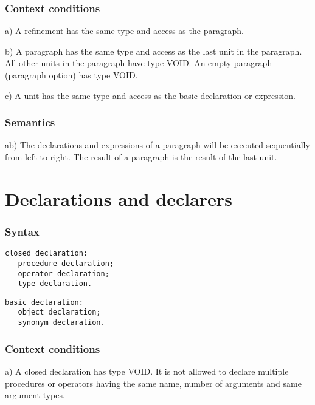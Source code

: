 \documentclass [a4paper,12pt,fleqn]{article}
\begin{document}
\subsubsection*{Context conditions}
\begin{list}{-}{}
\item[a)]
A refinement has the same type and access as the paragraph.
\item[b)]
A paragraph has the same type and access as the last unit in the
paragraph. All other units in the paragraph have type VOID.
An empty paragraph (paragraph option) has type VOID.
\item[c)]
A unit has the same type and access as the basic declaration or expression.
\end{list}
\subsubsection*{Semantics}
\begin{list}{-}{}
\item[ab)]
The declarations and expressions of a paragraph will be executed
sequentially from left to right. The result of a paragraph is
the result of the last unit.
\end{list}
\section {Declarations and declarers}
\subsubsection*{Syntax}
\begin{letterlist}
\item
\begin{verbatim}
closed declaration:
   procedure declaration;
   operator declaration;
   type declaration.
\end{verbatim}
\item
\begin{verbatim}
basic declaration:
   object declaration;
   synonym declaration.
\end{verbatim}
\end{letterlist}
\subsubsection*{Context conditions}
\begin{list}{-}{}
\item[a)]
A closed declaration has type VOID. It is not allowed to declare multiple
procedures or operators having the same name, number of arguments and same
argument types.
\end{list}
\end{document}
